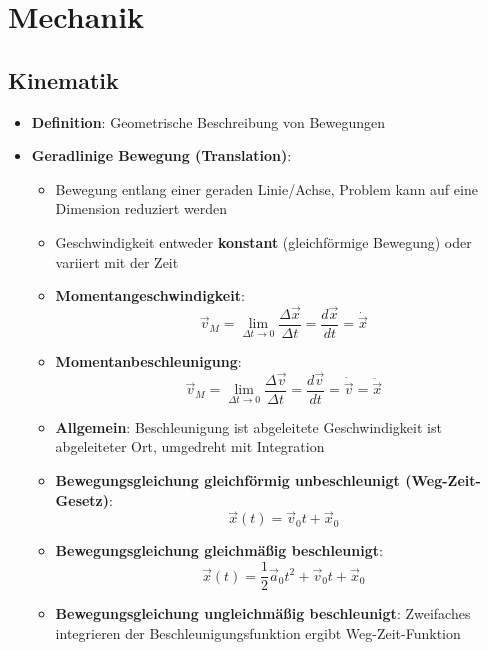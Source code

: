 \section{Mechanik}%
\label{mech:sec:mechanik}

\subsection{Kinematik}%
\label{mech:sub:kinematik}

\begin{itemize}
	\item \textbf{Definition}: Geometrische Beschreibung von Bewegungen
	\item \textbf{Geradlinige Bewegung (Translation)}:
	\begin{itemize}
		\item Bewegung entlang einer geraden Linie/Achse, Problem kann auf eine Dimension reduziert werden
		\item Geschwindigkeit entweder \textbf{konstant} (gleichförmige Bewegung) oder variiert mit der Zeit
		\item \textbf{Momentangeschwindigkeit}:
		\begin{equation}
			\vec{v}_M = \lim\limits_{\Delta t \rightarrow 0} \frac{\Delta \vec{x}}{\Delta t} = \frac{d\vec{x}}{dt} = \dot{\vec{x}}
		\end{equation}
		\item \textbf{Momentanbeschleunigung}:
		\begin{equation}
			\vec{v}_M = \lim\limits_{\Delta t \rightarrow 0} \frac{\Delta \vec{v}}{\Delta t} = \frac{d\vec{v}}{dt} = \dot{\vec{v}} = \ddot{\vec{x}}
		\end{equation}
		\item \textbf{Allgemein}: Beschleunigung ist abgeleitete Geschwindigkeit ist abgeleiteter Ort, umgedreht mit Integration
		\item \textbf{Bewegungsgleichung gleichförmig unbeschleunigt (Weg-Zeit-Gesetz)}:
		\begin{equation}
			\vec{x}(t) = \vec{v}_0t + \vec{x}_0
		\end{equation}
		\item \textbf{Bewegungsgleichung gleichmäßig beschleunigt}:
		\begin{equation}
			\vec{x}(t) = \frac{1}{2}\vec{a}_0t^2 + \vec{v}_0t + \vec{x}_0
		\end{equation}
		\item \textbf{Bewegungsgleichung ungleichmäßig beschleunigt}: Zweifaches integrieren der Beschleunigungsfunktion ergibt Weg-Zeit-Funktion

\end{itemize}
\end{itemize}
